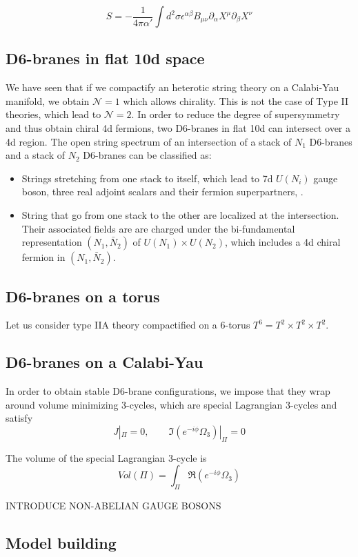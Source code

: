 \begin{equation}
  S= -\frac{1}{4\pi \alpha'}\int d^2\sigma \epsilon^{\alpha\beta} B_{\mu\nu}  \partial_\alpha X^\mu \partial_\beta X^\nu
\end{equation}

\subsection{D6-branes in flat 10d space}

We have seen that if we compactify an heterotic string theory on a Calabi-Yau manifold, we obtain
$\mathcal N=1$ which allows chirality. 
This is not the case of Type II theories, which lead to $\mathcal N=2$.
In order to reduce the degree of supersymmetry and thus obtain chiral 4d fermions, two D6-branes in flat 10d can intersect over a 4d region.
The open string spectrum of an intersection of a stack of $N_1$ D6-branes and a stack of $N_2$ D6-branes
can be classified as:

\begin{itemize}
  \item Strings stretching from one stack to itself, which lead to 7d $U(N_i)$ gauge boson, three real
    adjoint scalars and their fermion superpartners, .
  \item String that go from one stack to the other are localized at the intersection. 
    Their associated fields are are charged under the bi-fundamental representation $(N_1, \bar N_2)$ of 
    $U(N_1)\times U(N_2)$, which includes a 4d chiral fermion in $(N_1,\bar N_2)$.
\end{itemize}

\subsection{D6-branes on a torus}

Let us consider type IIA theory compactified on a 6-torus $T^6=T^2 \times T^2 \times T^2$.

\subsection{D6-branes on a Calabi-Yau}
In order to obtain stable D6-brane configurations, we impose that they wrap around volume 
minimizing 3-cycles, which are special Lagrangian 3-cycles and satisfy
\begin{equation}
  J|_\Pi = 0 , \qquad \Im (e^{-i\phi}\Omega_3)|_\Pi=0
\end{equation}

The volume of the special Lagrangian 3-cycle is
\begin{equation}
  Vol(\Pi)=\int_\Pi \Re(e^{-i\phi}\Omega_3)
\end{equation}




INTRODUCE NON-ABELIAN GAUGE BOSONS

\subsection{Model building}
